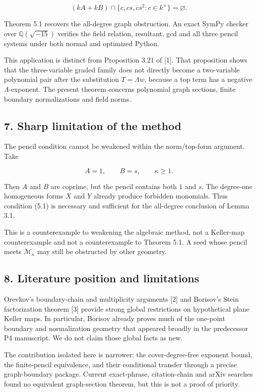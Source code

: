 \documentclass[
  11pt,
  a4paper,
]{article}
\begin{document}
\[
(kA+kB)\cap\{c,cs,cs^2:c\in k^\times\}=\varnothing.
\tag{6.3}
\]

Theorem 5.1 recovers the all-degree graph obstruction. An exact SymPy
checker over \(\mathbb Q(\sqrt{-15})\) verifies the field relation,
resultant, gcd and all three pencil systems under both normal and
optimized Python.

This application is distinct from Proposition 3.21 of {[}1{]}. That
proposition shows that the three-variable graded family does not
directly become a two-variable polynomial pair after the substitution
\(T=\Lambda w\), because a top term has a negative \(\Lambda\)-exponent.
The present theorem concerns polynomial graph sections, finite boundary
normalizations and field norms.

\subsection{7. Sharp limitation of the
method}\label{sharp-limitation-of-the-method}

The pencil condition cannot be weakened within the norm/top-form
argument. Take

\[
A=1,\qquad B=s,\qquad\kappa\ge1.
\]

Then \(A\) and \(B\) are coprime, but the pencil contains both \(1\) and
\(s\). The degree-one homogeneous forms \(X\) and \(Y\) already produce
forbidden monomials. Thus condition (5.1) is necessary and sufficient
for the all-degree conclusion of Lemma 3.1.

This is a counterexample to weakening the algebraic method, not a
Keller-map counterexample and not a counterexample to Theorem 5.1. A
seed whose pencil meets \(\mathcal M_\kappa\) may still be obstructed by
other geometry.

\subsection{8. Literature position and
limitations}\label{literature-position-and-limitations}

Orevkov's boundary-chain and multiplicity arguments {[}2{]} and
Borisov's Stein factorization theorem {[}3{]} provide strong global
restrictions on hypothetical plane Keller maps. In particular, Borisov
already proves much of the one-point boundary and normalization geometry
that appeared broadly in the predecessor P4 manuscript. We do not claim
those global facts as new.

The contribution isolated here is narrower: the cover-degree-free
exponent bound, the finite-pencil equivalence, and their conditional
transfer through a precise graph-boundary package. Current exact-phrase,
citation-chain and arXiv searches found no equivalent graph-section
theorem, but this is not a proof of priority.
\end{document}
